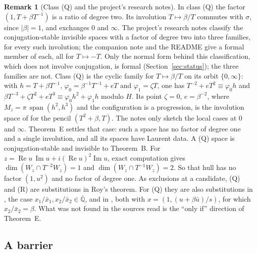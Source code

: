 \documentclass[11pt,a4paper]{article}
\theoremstyle{plain}
\theoremstyle{definition}
\newtheorem{remark}[theorem]{Remark}
\newcommand{\Qbar}{\overline{\mathbb{Q}}}
\newcommand{\spn}{\operatorname{span}}
\renewcommand{\Re}{\operatorname{Re}}
\renewcommand{\Im}{\operatorname{Im}}
\begin{document}
\begin{remark}[Class (Q) and the project's research notes]\label{rem:Qnew}
In class (Q) the factor $(1,T+\beta T^{-1})$ is a ratio of degree two. Its involution
$T\mapsto\beta/T$ commutes with $\sigma$, since $|\beta|=1$, and exchanges $0$ and $\infty$.
The project's research notes classify the conjugation-stable invisible spaces with a factor of
degree two into three families, for every such involution; the companion note \cite{CN} and the
README give a formal member of each, all for $T\mapsto-T$. Only the normal form behind this classification, which
does not involve conjugation, is formal (Section~\ref{sec:status}); the three families are not. Class (Q) is the
cyclic family for
$T\mapsto\beta/T$ on its orbit $\{0,\infty\}$: with $h=T+\beta T^{-1}$,
$\varphi_{0}=\beta^{-1}T^{-1}+eT$ and $\varphi_{1}=\zeta T$, one has
$T^{-2}+eT^{2}\equiv\varphi_{0}h$ and $\beta T^{-3}+\zeta T^{2}+eT^{3}\equiv\varphi_{0}h^{2}+\varphi_{1}h$
modulo $H$. Its point $\zeta=0$, $e=\beta^{-2}$, where $M_{z}=\pi\,\spn(h^{2},h^{3})$ and the configuration is a
progression, is the involution space of \cite[Prop.~10.38, Thm.~10.40]{BP} for the pencil $(T^{2}+\beta,T)$.
The notes only sketch the local cases at $0$ and $\infty$. Theorem~E settles that case: such a space has no
factor of degree one and a single involution, and all its spaces have Laurent data. A (Q) space is conjugation-stable and invisible to
Theorem~B. For
$z=\Re u\,\Im u+i(\Re u)^{2}\Im u$, exact computation gives
$\dim(W_{z}\cap T^{-2}W_{z})=1$ and $\dim(W_{z}\cap T^{-1}W_{z})=2$. So that hull has no
factor $(1,u^{2})$ and no factor of degree one. As exclusions at a candidate, (Q) and (R) are
substitutions in Roy's theorem. For (Q) they are also substitutions in \cite[Th\'eor\`eme~2]{Dia04}, the case
$x_{1}/\bar x_{1},x_{2}/\bar x_{2}\in\Qbar$, and in \cite[Th\'eor\`eme~4(1)]{Dia07}, both with
$x=(1,(u+\beta\bar u)/s)$, for which $x_{2}/\bar x_{2}=\beta$. What was not found in the sources read is the ``only if''
direction of Theorem~E.
\end{remark}

\subsection*{A barrier}
\end{document}
